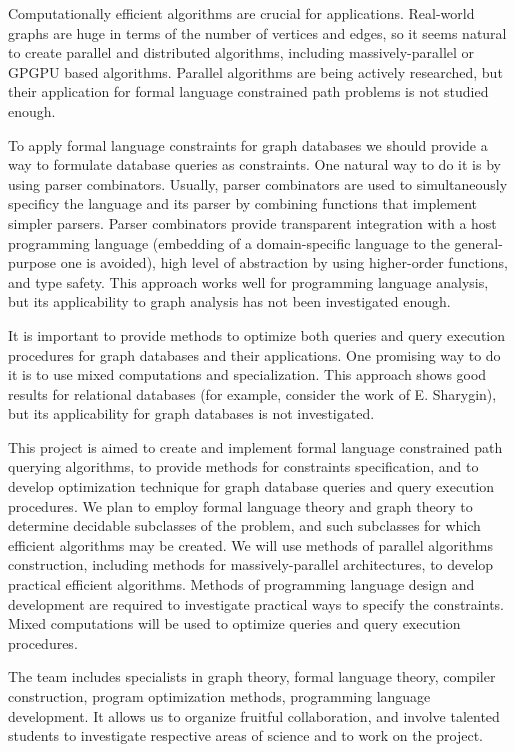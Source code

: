 \documentclass[12pt]{article}  %
\theoremstyle{remark}
\begin{document}
Computationally efficient algorithms are crucial for applications.
Real-world graphs are huge in terms of the number of vertices and edges, so it seems natural to create parallel and distributed algorithms, including massively-parallel or GPGPU based algorithms.
Parallel algorithms are being actively researched, but their application for formal language constrained path problems is not studied enough.

To apply formal language constraints for graph databases we should provide a way to formulate database queries as constraints.
One natural way to do it is by using parser combinators.
Usually, parser combinators are used to simultaneously specificy the language and its parser by combining functions that implement simpler parsers.
Parser combinators provide transparent integration with a host programming language (embedding of a domain-specific language to the general-purpose one is avoided), high level of abstraction by using higher-order functions, and type safety.
This approach works well for programming language analysis, but its applicability to graph analysis has not been investigated enough.

It is important to provide methods to optimize both queries and query execution procedures for graph databases and their applications.
One promising way to do it is to use mixed computations and specialization.
This approach shows good results for relational databases (for example, consider the work of E. Sharygin), but its applicability for graph databases is not investigated.

This project is aimed to create and implement formal language constrained path querying algorithms, to provide methods for constraints specification, and to develop optimization technique for graph database queries and query execution procedures.
We plan to employ formal language theory and graph theory to determine decidable subclasses of the problem, and such subclasses for which efficient algorithms may be created.
We will use methods of parallel algorithms construction, including methods for massively-parallel architectures, to develop practical efficient algorithms.
Methods of programming language design and development are required to investigate practical ways to specify the constraints.
Mixed computations will be used to optimize queries and query execution procedures.

The team includes specialists in graph theory, formal language theory, compiler construction, program optimization methods, programming language development. It allows us to organize fruitful collaboration, and involve talented students to investigate respective areas of science and to work on the project.
\end{document}
